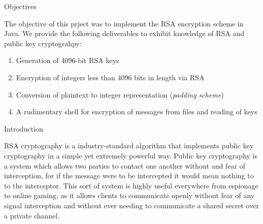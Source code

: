 \documentclass[landscape,fontscale=.4,paperwidth=48in,paperheight=36in]{baposter} %
\newcommand{\compresslist}{ %
\setlength{\itemsep}{1pt}
\setlength{\parskip}{0pt}
\setlength{\parsep}{0pt}
}
\begin{document}
\begin{poster}

\begin{posterbox}[name=objectives,column=0,row=0,span=13]{Objectives}

The objective of this prject was to implement the RSA encryption scheme in Java. We provide the following deliverables to exhibit knowledge of RSA and public key cryptograhpy:

\begin{enumerate}\compresslist
\item Generation of 4096-bit RSA keys
\item Encryption of integers less than 4096 bits in length via RSA
\item Conversion of plaintext to integer representation (\emph{padding scheme})
\item A rudimentary shell for encryption of messages from files and reading of keys
\end{enumerate}

\vspace{0.3em} %
\end{posterbox}


\begin{posterbox}[name=intro,column=0,below=objectives, span=13]{Introduction}

RSA cryptography is a industry-standard algorithm that implements public key cryptography in a simple yet extremely powerful way. Public key cryptography is a system which allows two parties to contact one another without and fear of interception, for if the message were to be intercepted it would mean nothing to to the interceptor. This sort of system is highly useful everywhere from espionage to online gaming, as it allows clients to communicate openly without fear of any signal interception and without ever needing to communicate a shared secret over a private channel.


\end{posterbox}
\end{poster}
\end{document}
